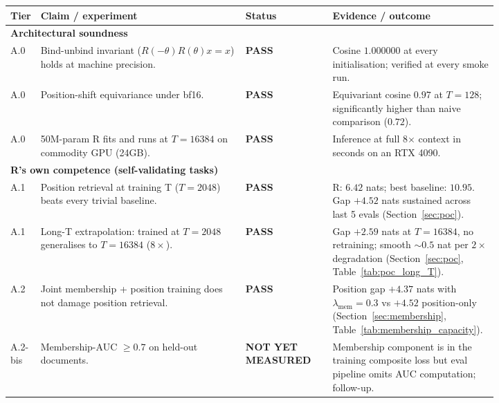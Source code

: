 \documentclass[10pt, twocolumn, a4paper]{article}
\begin{document}
\begin{table}[h]
\centering\small
\begin{tabular}{@{}p{0.06\linewidth} p{0.42\linewidth} l p{0.34\linewidth}@{}}
\toprule
\textbf{Tier} & \textbf{Claim / experiment} & \textbf{Status} & \textbf{Evidence / outcome} \\
\midrule

\multicolumn{4}{l}{\textbf{Architectural soundness}} \\
\midrule
A.0 & Bind-unbind invariant ($R(-\theta) R(\theta) x = x$) holds at machine precision. & \textbf{PASS} & Cosine $1.000000$ at every initialisation; verified at every smoke run. \\
A.0 & Position-shift equivariance under bf16. & \textbf{PASS} & Equivariant cosine $0.97$ at $T=128$; significantly higher than naive comparison ($0.72$). \\
A.0 & 50M-param R fits and runs at $T=16384$ on commodity GPU (24GB). & \textbf{PASS} & Inference at full 8$\times$ context in seconds on an RTX 4090. \\

\midrule
\multicolumn{4}{l}{\textbf{R's own competence (self-validating tasks)}} \\
\midrule
A.1 & Position retrieval at training T ($T=2048$) beats every trivial baseline. & \textbf{PASS} & R: $6.42$ nats; best baseline: $10.95$. Gap $+4.52$ nats sustained across last 5 evals (Section~\ref{sec:poc}). \\
A.1 & Long-T extrapolation: trained at $T=2048$ generalises to $T=16384$ ($8\times$). & \textbf{PASS} & Gap $+2.59$ nats at $T=16384$, no retraining; smooth $\sim 0.5$ nat per $2\times$ degradation (Section~\ref{sec:poc}, Table~\ref{tab:poc_long_T}). \\
A.2 & Joint membership + position training does not damage position retrieval. & \textbf{PASS} & Position gap $+4.37$ nats with $\lambda_{\text{mem}}=0.3$ vs $+4.52$ position-only (Section~\ref{sec:membership}, Table~\ref{tab:membership_capacity}). \\
A.2-bis & Membership-AUC $\ge 0.7$ on held-out documents. & \textbf{NOT YET MEASURED} & Membership component is in the training composite loss but eval pipeline omits AUC computation; follow-up. \\


\end{tabular}
\end{table}
\end{document}
